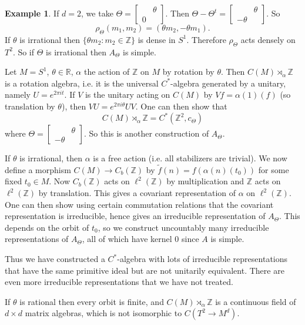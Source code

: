 \documentclass[12pt]{report}
\newcommand{\ZZ}{\mathbb{Z}}
\newcommand{\RR}{\mathbb{R}}
\theoremstyle{definition}
\newtheorem{example}[theorem]{Example}
\begin{document}
\begin{example}
    If $d = 2$, we take $\Theta = \begin{bmatrix}&\theta\\0&\end{bmatrix}$. Then $\Theta - \Theta^t = \begin{bmatrix}&\theta\\-\theta&\end{bmatrix}$. So
    $$\rho_\Theta(m_1, m_2) = (\theta m_2, -\theta m_1).$$
    If $\theta$ is irrational then $\{\theta m_2: m_2 \in \ZZ\}$ is dense in $S^1$. Therefore $\rho_\Theta$ acts densely on $T^2$. So if $\Theta$ is irrational then $A_\Theta$ is simple.

    Let $M = S^1$, $\theta \in \RR$, $\alpha$ the action of $\ZZ$ on $M$ by rotation by $\theta$. Then $C(M) \rtimes_\alpha \ZZ$ is a rotation algebra, i.e. it is the universal $C^*$-algebra generated by a unitary, namely $U = e^{2\pi i t}$. If $V$ is the unitary acting on $C(M)$ by $Vf = \alpha(1)(f)$ (so translation by $\theta$), then $VU = e^{2\pi i\theta}UV$. One can then show that
    $$C(M) \rtimes_\alpha \ZZ = C^*(\ZZ^2, c_\Theta)$$
    where $\Theta = \begin{bmatrix}&\theta\\-\theta&\end{bmatrix}$. So this is another construction of $A_\Theta$.

    If $\theta$ is irrational, then $\alpha$ is a free action (i.e. all stabilizers are trivial). We now define a morphism $C(M) \to C_b(\ZZ)$ by $\tilde f(n) = f(\alpha(n)(t_0))$ for some fixed $t_0 \in M$. Now $C_b(\ZZ)$ acts on $\ell^2(\ZZ)$ by multiplication and $\ZZ$ acts on $\ell^2(\ZZ)$ by translation. This gives a covariant representation of $\alpha$ on $\ell^2(\ZZ)$. One can then show using certain commutation relations that the covariant representation is irreducible, hence gives an irreducible representation of $A_\Theta$. This depends on the orbit of $t_0$, so we construct uncountably many irreducible representations of $A_\Theta$, all of which have kernel $0$ since $A$ is simple.

    Thus we have constructed a $C^*$-algebra with lots of irreducible representations that have the same primitive ideal but are not unitarily equivalent. There are even more irreducible representations that we have not treated.

    If $\theta$ is rational then every orbit is finite, and $C(M) \rtimes_\alpha \ZZ$ is a continuous field of $d \times d$ matrix algebras, which is not isomorphic to $C(T^2 \to M^d)$.
\end{example}
\end{document}
